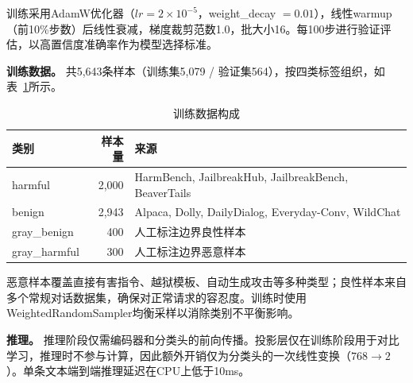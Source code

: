训练采用AdamW优化器（$lr = 2 \times 10^{-5}$，weight\_decay $= 0.01$），线性warmup（前10\%步数）后线性衰减，梯度裁剪范数1.0，批大小16。每100步进行验证评估，以高置信度准确率作为模型选择标准。

\textbf{训练数据。} 共5,643条样本（训练集5,079 / 验证集564），按四类标签组织，如表~\ref{tab:training_data}所示。

\begin{table}[t]
\centering
\caption{训练数据构成}
\label{tab:training_data}
\begin{tabular}{lrl}
\toprule
\textbf{类别} & \textbf{样本量} & \textbf{来源} \\
\midrule
harmful & 2,000 & HarmBench, JailbreakHub, JailbreakBench, BeaverTails \\
benign & 2,943 & Alpaca, Dolly, DailyDialog, Everyday-Conv, WildChat \\
gray\_benign & 400 & 人工标注边界良性样本 \\
gray\_harmful & 300 & 人工标注边界恶意样本 \\
\bottomrule
\end{tabular}
\end{table}

恶意样本覆盖直接有害指令、越狱模板、自动生成攻击等多种类型；良性样本来自多个常规对话数据集，确保对正常请求的容忍度。训练时使用WeightedRandomSampler均衡采样以消除类别不平衡影响。

\textbf{推理。} 推理阶段仅需编码器和分类头的前向传播。投影层仅在训练阶段用于对比学习，推理时不参与计算，因此额外开销仅为分类头的一次线性变换（$768 \rightarrow 2$）。单条文本端到端推理延迟在CPU上低于10ms。
